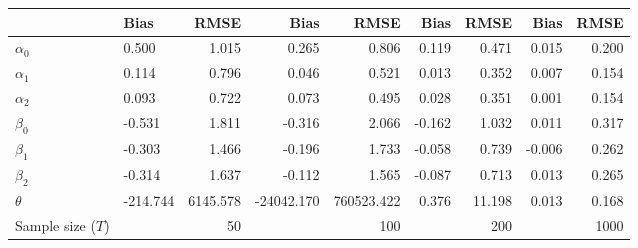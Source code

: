 
\begin{tabular}[t]{llrrrrrrr}
\toprule
  & Bias & RMSE & Bias & RMSE & Bias & RMSE & Bias & RMSE\\
\midrule
$\alpha_{0}$ & 0.500 & 1.015 & 0.265 & 0.806 & 0.119 & 0.471 & 0.015 & 0.200\\
$\alpha_{1}$ & 0.114 & 0.796 & 0.046 & 0.521 & 0.013 & 0.352 & 0.007 & 0.154\\
$\alpha_{2}$ & 0.093 & 0.722 & 0.073 & 0.495 & 0.028 & 0.351 & 0.001 & 0.154\\
$\beta_{0}$ & -0.531 & 1.811 & -0.316 & 2.066 & -0.162 & 1.032 & 0.011 & 0.317\\
$\beta_{1}$ & -0.303 & 1.466 & -0.196 & 1.733 & -0.058 & 0.739 & -0.006 & 0.262\\
$\beta_{2}$ & -0.314 & 1.637 & -0.112 & 1.565 & -0.087 & 0.713 & 0.013 & 0.265\\
$\theta$ & -214.744 & 6145.578 & -24042.170 & 760523.422 & 0.376 & 11.198 & 0.013 & 0.168\\
Sample size ($T$) &  & 50 &  & 100 &  & 200 &  & 1000\\
\bottomrule
\end{tabular}

